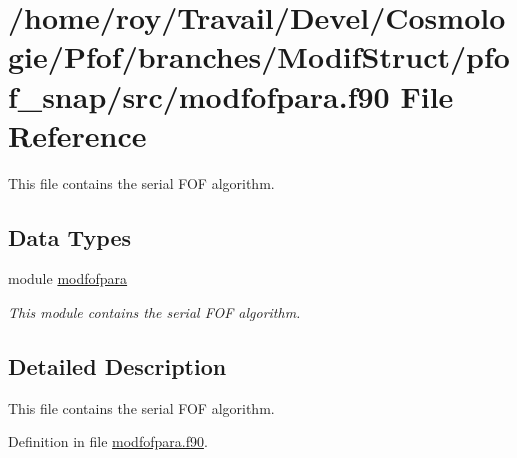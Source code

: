 \hypertarget{pfof__snap_2src_2modfofpara_8f90}{\section{/home/roy/\-Travail/\-Devel/\-Cosmologie/\-Pfof/branches/\-Modif\-Struct/pfof\-\_\-snap/src/modfofpara.f90 File Reference}
\label{pfof__snap_2src_2modfofpara_8f90}
}


This file contains the serial F\-O\-F algorithm.  


\subsection*{Data Types}
\begin{DoxyCompactItemize}
\item 
module \hyperlink{classmodfofpara}{modfofpara}
\begin{DoxyCompactList}\small\item\em This module contains the serial F\-O\-F algorithm. \end{DoxyCompactList}\end{DoxyCompactItemize}


\subsection{Detailed Description}
This file contains the serial F\-O\-F algorithm. 

Definition in file \hyperlink{pfof__snap_2src_2modfofpara_8f90_source}{modfofpara.\-f90}.

